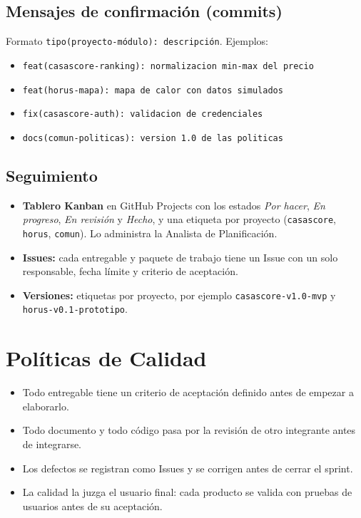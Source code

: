 \documentclass[11pt,a4paper]{article}
\begin{document}
\subsection{Mensajes de confirmación (commits)}
Formato \texttt{tipo(proyecto-módulo): descripción}. Ejemplos:
\begin{itemize}[leftmargin=*]
    \item \texttt{feat(casascore-ranking): normalizacion min-max del precio}
    \item \texttt{feat(horus-mapa): mapa de calor con datos simulados}
    \item \texttt{fix(casascore-auth): validacion de credenciales}
    \item \texttt{docs(comun-politicas): version 1.0 de las politicas}
\end{itemize}

\subsection{Seguimiento}
\begin{itemize}[leftmargin=*]
    \item \textbf{Tablero Kanban} en GitHub Projects con los estados \textit{Por hacer}, \textit{En progreso}, \textit{En revisión} y \textit{Hecho}, y una etiqueta por proyecto (\texttt{casascore}, \texttt{horus}, \texttt{comun}). Lo administra la Analista de Planificación.
    \item \textbf{Issues:} cada entregable y paquete de trabajo tiene un Issue con un solo responsable, fecha límite y criterio de aceptación.
    \item \textbf{Versiones:} etiquetas por proyecto, por ejemplo \texttt{casascore-v1.0-mvp} y \texttt{horus-v0.1-prototipo}.
\end{itemize}

\section{Políticas de Calidad}
\begin{itemize}[leftmargin=*]
    \item Todo entregable tiene un criterio de aceptación definido antes de empezar a elaborarlo.
    \item Todo documento y todo código pasa por la revisión de otro integrante antes de integrarse.
    \item Los defectos se registran como Issues y se corrigen antes de cerrar el sprint.
    \item La calidad la juzga el usuario final: cada producto se valida con pruebas de usuarios antes de su aceptación.
\end{itemize}
\end{document}
